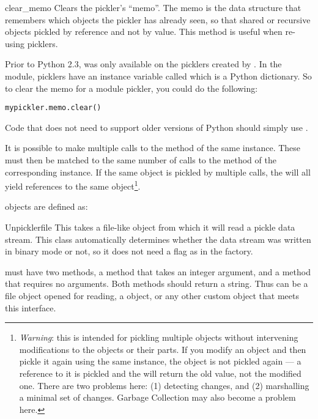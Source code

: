 \begin{methoddesc}[Pickler]{clear_memo}{}
Clears the pickler's ``memo''.  The memo is the data structure that
remembers which objects the pickler has already seen, so that shared
or recursive objects pickled by reference and not by value.  This
method is useful when re-using picklers.

\begin{notice}
Prior to Python 2.3,  was only available on the
picklers created by .  In the  module,
picklers have an instance variable called  which is a
Python dictionary.  So to clear the memo for a  module
pickler, you could do the following:

\begin{verbatim}
mypickler.memo.clear()
\end{verbatim}

Code that does not need to support older versions of Python should
simply use .
\end{notice}
\end{methoddesc}

It is possible to make multiple calls to the  method of
the same  instance.  These must then be matched to the
same number of calls to the  method of the
corresponding  instance.  If the same object is
pickled by multiple  calls, the  will
all yield references to the same object\footnote{\emph{Warning}: this
is intended for pickling multiple objects without intervening
modifications to the objects or their parts.  If you modify an object
and then pickle it again using the same  instance, the
object is not pickled again --- a reference to it is pickled and the
 will return the old value, not the modified one.
There are two problems here: (1) detecting changes, and (2)
marshalling a minimal set of changes.  Garbage Collection may also
become a problem here.}.

 objects are defined as:

\begin{classdesc}{Unpickler}{file}
This takes a file-like object from which it will read a pickle data
stream.  This class automatically determines whether the data stream
was written in binary mode or not, so it does not need a flag as in
the  factory.

 must have two methods, a  method that takes
an integer argument, and a  method that requires no
arguments.  Both methods should return a string.  Thus  can
be a file object opened for reading, a
 object, or any other custom
object that meets this interface.
\end{classdesc}

